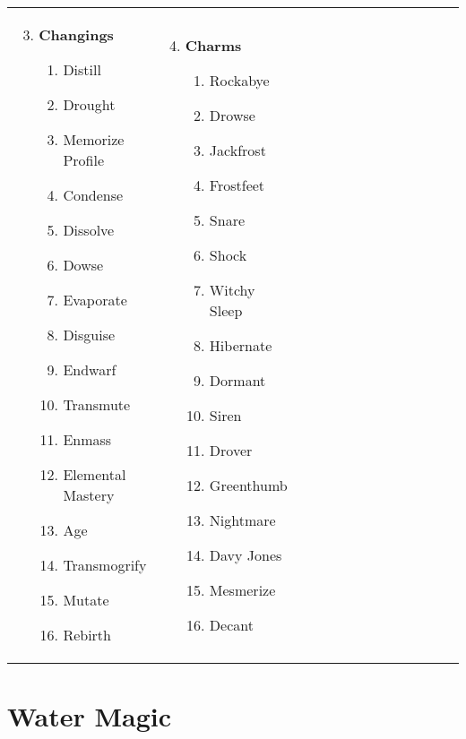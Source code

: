 \begin{tabular}{@{} p{0.25\linewidth} p{0.25\linewidth} p{0.25\linewidth} p{0.25\linewidth}}
\begin{enumerate}
	\setcounter{enumi}{2}
	\item \textbf{Changings}
	\begin{enumerate}
		\item Distill
		\item Drought
		\item Memorize Profile
		\item Condense
		\item Dissolve
		\item Dowse
		\item Evaporate
		\item Disguise
		\item Endwarf
		\item Transmute
		\item Enmass
		\item Elemental Mastery
		\item Age
		\item Transmogrify
		\item Mutate
		\item Rebirth
	\end{enumerate}
\end{enumerate} &
\begin{enumerate}
	\setcounter{enumi}{3}
	\item \textbf{Charms}
	\begin{enumerate}
		\item Rockabye
		\item Drowse
		\item Jackfrost
		\item Frostfeet
		\item Snare
		\item Shock
		\item Witchy Sleep
		\item Hibernate
		\item Dormant
		\item Siren
		\item Drover
		\item Greenthumb
		\item Nightmare
		\item Davy Jones
		\item Mesmerize
		\item Decant
	\end{enumerate}
\end{enumerate} \\
\end{tabular}
\pagebreak
\section{Water Magic}

